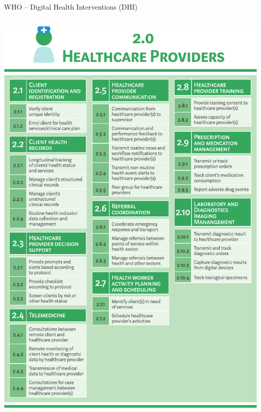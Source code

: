 \documentclass[aspectratio=1610,12pt]{beamer}
\begin{document}
\begin{frame}{WHO -- Digital Health Interventions (DHI)}
\begin{columns}
  \vspace{0.5cm}
  \centering
  \includegraphics[height=.8\textheight]{img/whodhi-providers.pdf}
  \vspace{0.5cm}
  \centering

\end{columns}
\end{frame}
\end{document}
